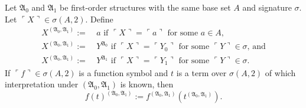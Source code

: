 \documentclass[12pt]{article}
\numberwithin{equation}{section}
\begin{document}
\begin{defi}
Let $\mathfrak{A}_0$ and $\mathfrak{A}_1$ be first-order structures with the same base set $A$ and signature $\sigma$. Let $\ulcorner X \urcorner \in \sigma(A, 2)$.
Define
\begin{align*}
    X^{(\mathfrak{A}_0, \mathfrak{A}_1)} := \ & a \text{ if } \ulcorner X \urcorner = \ulcorner a \urcorner \text{ for some } a \in A \text{,} \\
    X^{(\mathfrak{A}_0, \mathfrak{A}_1)} := \ & Y^{\mathfrak{A}_0} \text{ if } \ulcorner X \urcorner = \ulcorner Y_0 \urcorner \text{ for some } \ulcorner Y \urcorner \in \sigma \text{, and} \\
    X^{(\mathfrak{A}_0, \mathfrak{A}_1)} := \ & Y^{\mathfrak{A}_1} \text{ if } \ulcorner X \urcorner = \ulcorner Y_1 \urcorner \text{ for some } \ulcorner Y \urcorner \in \sigma \text{.}
\end{align*}
If $\ulcorner f \urcorner \in \sigma(A, 2)$ is a function symbol and $t$ is a term over $\sigma(A, 2)$ of which interpretation under $(\mathfrak{A}_0, \mathfrak{A}_1)$ is known, then 
\begin{equation*}
    f(t)^{(\mathfrak{A}_0, \mathfrak{A}_1)} := f^{(\mathfrak{A}_0, \mathfrak{A}_1)}(t^{(\mathfrak{A}_0, \mathfrak{A}_1)}) \text{.}
\end{equation*}
\end{defi}
\end{document}
